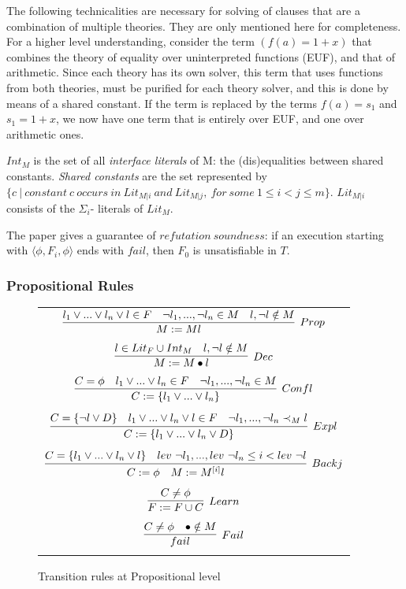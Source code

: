 \documentclass{article}
\begin{document}
The following technicalities are necessary 
for solving of clauses that are a 
combination of multiple theories. They are only 
mentioned here for completeness. For a higher
level understanding, consider the term 
$(f(a) = 1 + x)$ that
combines the theory of equality over 
uninterpreted functions (EUF), and that of arithmetic. 
Since each theory has its own solver,
this term that uses functions from both theories, 
must be purified for each theory solver, 
and this is done by means of
a shared constant. If the term is replaced by 
the terms $f(a) = s_1$ and $s_1 = 1 + x$,
we now have one term that is entirely over 
EUF, and one over arithmetic ones.

$Int_M$ is the set of all 
\textit{interface literals} of M: the 
(dis)equalities between shared constants. 
\textit{Shared constants} are the set 
represented by \\
$\{c\ |\ constant\ c\ occurs\ in\ Lit_{M|i}\ and\ Lit_{M|j},\ 
for\ some\ 1 \leq i < j \leq m\}$. 
$Lit_{M|i}$ consists of the $\Sigma_i$- literals of $Lit_M$.

The paper gives a guarantee of $refutation\ soundness$:
if an execution starting with 
$\langle \phi, F_i, \phi \rangle$ ends with $fail$, 
then $F_0$ is unsatisfiable in $T$.

\subsubsection{Propositional Rules}
\label{sec:proprules}
	
\begin{figure}[t]
	\centering
	\begin{framed}
		\begin{tabular}{c}
			$\infer[Prop]{M := Ml}{l_1 \lor ... \lor l_n \lor l \in F 
				& \neg l_1,...,\neg l_n \in M & l, \neg l \notin M}$ \\ \\
			$\infer[Dec]{M := M \bullet l}
			{l \in Lit_F \cup Int_M & l, \neg l \notin M}$ \\ \\
			$\infer[Confl]{C:=\{l_1 \lor ... \lor l_n\}}
			{C = \phi & l_1 \lor ... \lor l_n \in F & \neg l_1,...,\neg l_n \in M}$ \\ \\
			$\infer[Expl]{C := \{l_1 \lor ... \lor l_n \lor D\}}
			{C = \{\neg l \lor D\} & l_1 \lor ... \lor l_n \lor l \in F 
				& \neg l_1,...,\neg l_n \prec_M l}$ \\ \\
			$\infer[Backj]{C := \phi\ \ \ M := M^{[i]}l}
			{C = \{l_1 \lor ... \lor l_n \lor l\} & 
				lev\ \neg l_1, ... , lev\ \neg l_n \leq i < lev\ \neg l}$ \\ \\
			$\infer[Learn]{F := F \cup C}{C \neq \phi}$ \\ \\
			$\infer[Fail]{fail}{C \neq \phi & \bullet \notin M}$ \\ \\
		\end{tabular}
	\end{framed}
	\caption{Transition rules at Propositional level}
	\label{fig:proprules}
\end{figure}
\end{document}
